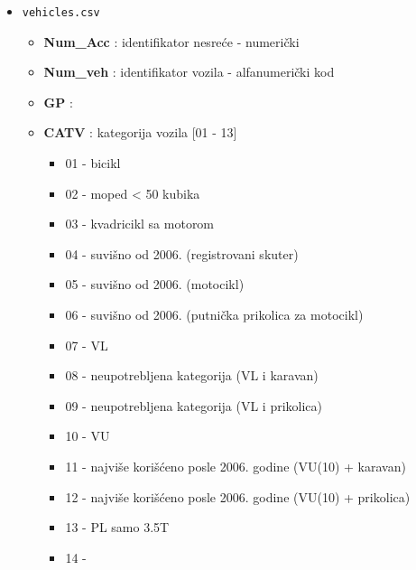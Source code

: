 \documentclass[a4paper,10pt]{article}
\begin{document}
\begin{itemize}
\begin{itemize}
 \end{itemize}
 
 \item \texttt{vehicles.csv}
 \begin{itemize}
  \item \textbf{Num\_Acc} : identifikator nesreće - numerički
  \item \textbf{Num\_veh} : identifikator vozila - alfanumerički kod
  \item \textbf{GP} : %
  \item \textbf{CATV} : kategorija vozila [01 - 13]
		      \begin{itemize}
		       \item 01 - bicikl
		       \item 02 - moped < 50 kubika
		       \item 03 - kvadricikl sa motorom
		       \item 04 - suvišno od 2006. (registrovani skuter)
		       \item 05 - suvišno od 2006. (motocikl)
		       \item 06 - suvišno od 2006. (putnička prikolica za motocikl)
		       \item 07 - VL %
		       \item 08 - neupotrebljena kategorija (VL i karavan)
		       \item 09 - neupotrebljena kategorija (VL i prikolica)
		       \item 10 - VU %
		       \item 11 - najviše korišćeno posle 2006. godine (VU(10) + karavan)
		       \item 12 - najviše korišćeno posle 2006. godine (VU(10) + prikolica)
		       \item 13 - PL samo 3.5T
		       \item 14 - 
		      \end{itemize}

 \end{itemize}
 
\end{itemize}
\end{document}
